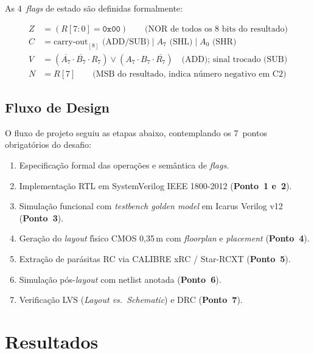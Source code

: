 \documentclass[12pt,a4paper]{article}
\begin{document}
As 4~\textit{flags} de estado s\~{a}o definidas formalmente:

\begin{align}
  Z &= (R[7:0] = \texttt{0x00})
    \qquad\text{(NOR de todos os 8~bits do resultado)} \label{eq:z}\\
  C &= \text{carry-out}_{[8]} \text{ (ADD/SUB)}
     \;|\; A_7 \text{ (SHL)}
     \;|\; A_0 \text{ (SHR)} \label{eq:c}\\
  V &= (\overline{A_7} \cdot \overline{B_7} \cdot R_7) \lor (A_7 \cdot B_7 \cdot \overline{R_7})
    \quad\text{(ADD); sinal trocado (SUB)} \label{eq:v}\\
  N &= R[7]
    \qquad\text{(MSB do resultado, indica n\'{u}mero negativo em C2)} \label{eq:n}
\end{align}

\subsection{Fluxo de Design}

O fluxo de projeto seguiu as etapas abaixo, contemplando os 7~pontos obrigat\'{o}rios do desafio:

\begin{enumerate}[leftmargin=2em,label=\textbf{E\arabic*.}]
  \item Especifica\c{c}\~{a}o formal das opera\c{c}\~{o}es e sem\^{a}ntica de \textit{flags}.
  \item Implementa\c{c}\~{a}o RTL em SystemVerilog IEEE 1800-2012 (\textbf{Ponto~1 e~2}).
  \item Simula\c{c}\~{a}o funcional com \textit{testbench golden model} em Icarus Verilog v12 (\textbf{Ponto~3}).
  \item Gera\c{c}\~{a}o do \textit{layout} f\'{\i}sico CMOS 0,35\,\textmu m com \textit{floorplan} e \textit{placement} (\textbf{Ponto~4}).
  \item Extra\c{c}\~{a}o de par\'{a}sitas RC via CALIBRE xRC / Star-RCXT (\textbf{Ponto~5}).
  \item Simula\c{c}\~{a}o p\'{o}s-\textit{layout} com netlist anotada (\textbf{Ponto~6}).
  \item Verifica\c{c}\~{a}o LVS (\textit{Layout vs.\ Schematic}) e DRC (\textbf{Ponto~7}).
\end{enumerate}

\section{Resultados}
\end{document}
